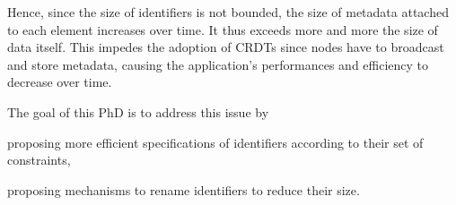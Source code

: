 \documentclass{article}
\begin{document}


Hence, since the size of identifiers is not bounded, the size of metadata attached to each element increases over time.
It thus exceeds more and more the size of data itself.
This impedes the adoption of \acp{CRDT} since nodes have to broadcast and store metadata, causing the application's performances and efficiency to decrease over time.

The goal of this PhD is to address this issue by
\begin{enumerate*}
  \item proposing more efficient specifications of identifiers according to their set of constraints,
  \item proposing mechanisms to rename identifiers to reduce their size.
\end{enumerate*}




\end{document}
